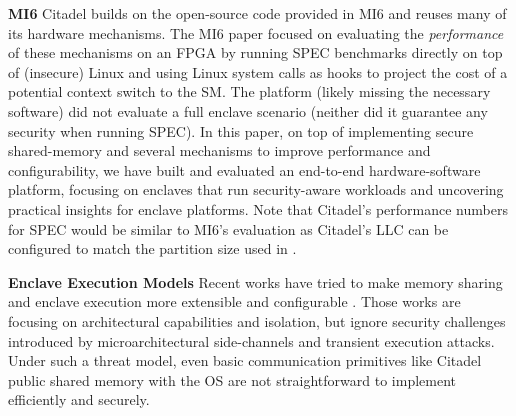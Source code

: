 \noindent\textbf{MI6}
Citadel builds on the open-source code provided in MI6 \cite{bourgeat2019mi6} and reuses many of its hardware mechanisms.
The MI6 paper focused on evaluating the \emph{performance} of these mechanisms on an FPGA
by running SPEC benchmarks directly on top of (insecure) Linux and using Linux system calls as hooks to project the cost of a potential context switch to the SM.
The platform (likely missing the necessary software) did not evaluate a full enclave scenario (neither did it guarantee any security when running SPEC).
In this paper, on top of implementing secure shared-memory and several mechanisms to improve performance and configurability, we have built and evaluated an end-to-end hardware-software platform, focusing on enclaves that run security-aware workloads and uncovering practical insights for enclave platforms.
Note that Citadel's performance numbers for SPEC would be similar to MI6's evaluation as Citadel's LLC can be configured to match the partition size used in \cite{bourgeat2019mi6}.

\noindent\textbf{Enclave Execution Models}
Recent works have tried to make memory sharing and enclave execution more extensible and configurable \cite{van2023cheri, li2021confidential, lee2022cerberus, park2020nested, steinegger2021servas}.
Those works are focusing on architectural capabilities and isolation, but ignore security challenges introduced by microarchitectural side-channels and transient execution attacks.
Under such a threat model, even basic communication primitives like Citadel public shared memory with the OS are not straightforward to implement efficiently and securely.